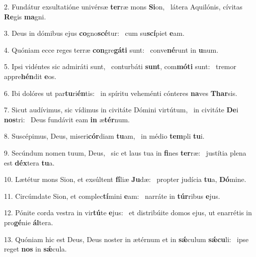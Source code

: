 2. Fundátur exsultatióne univérsæ \textbf{ter}ræ mons \textbf{Si}on, \ast\  látera Aquilónis, cívitas \textbf{Re}gis \textbf{ma}gni.\

3. Deus in dómibus ejus \textbf{co}gno\textbf{scé}tur: \ast\  cum su\textbf{scí}piet \textbf{e}am.\

4. Quóniam ecce reges terræ \textbf{con}gre\textbf{gá}\textbf{ti} sunt: \ast\  conve\textbf{né}runt in \textbf{u}num.\

5. Ipsi vidéntes sic admiráti sunt, \dag\  conturbáti \textbf{sunt}, com\textbf{mó}\textbf{ti} sunt: \ast\  tremor appre\textbf{hén}dit \textbf{e}os.\

6. Ibi dolóres ut par\textbf{tu}ri\textbf{én}tis: \ast\  in spíritu veheménti cónteres \textbf{na}ves \textbf{Thar}sis.\

7. Sicut audívimus, sic vídimus in civitáte Dómini virtútum, \dag\  in civitáte \textbf{De}i \textbf{nos}tri: \ast\  Deus fundávit eam \textbf{in} æ\textbf{tér}num.\

8. Suscépimus, Deus, miseri\textbf{cór}diam \textbf{tu}am, \ast\  in médio \textbf{tem}pli \textbf{tu}i.\

9. Secúndum nomen tuum, Deus, \dag\  sic et laus tua in \textbf{fi}nes \textbf{ter}ræ: \ast\  justítia plena est \textbf{déx}tera \textbf{tu}a.\

10. Lætétur mons Sion, et exsúltent \textbf{fí}liæ \textbf{Ju}dæ: \ast\  propter judícia \textbf{tu}a, \textbf{Dó}mine.\

11. Circúmdate Sion, et complec\textbf{tí}mini \textbf{e}am: \ast\  narráte in \textbf{túr}ribus \textbf{e}jus.\

12. Pónite corda vestra in vir\textbf{tú}te \textbf{e}jus: \ast\  et distribúite domos ejus, ut enarrétis in pro\textbf{gé}nie \textbf{ál}tera.\

13. Quóniam hic est Deus, Deus noster in ætérnum et in \textbf{sǽ}culum \textbf{sǽ}\textbf{cu}li: \ast\  ipse reget \textbf{nos} in \textbf{sǽ}cula.\

